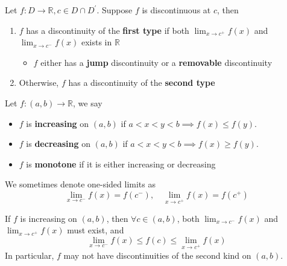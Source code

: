 
\begin{definition}
    Let $f: D \to \mathbb{R}, c \in D \cap D^{\prime}$.
    Suppose $f$ is discontinuous at $c$, then
    \begin{enumerate}
        \item $f$ has a discontinuity of the \textbf{first type} if 
        both
        $\lim_{x \to c^+}f(x)$ and $\lim_{x \to c^-}f(x)$ exists in $\mathbb{R}$
        \begin{itemize}
            \item $f$ either has a \textbf{jump} discontinuity or a \textbf{removable} discontinuity
        \end{itemize} 
        \item Otherwise, $f$ has a discontinuity of the \textbf{second type}
    \end{enumerate} 
\end{definition}

\begin{definition}
    Let $f: (a, b) \to \mathbb{R}$, we say 
    \begin{itemize}
        \item 
    $f$ is \textbf{increasing} 
    on $(a, b)$ 
    if $a < x  < y < b \implies f(x) \leq f(y)$.
        \item 
    $f$ is \textbf{decreasing} 
    on $(a, b)$ 
    if $a < x  < y < b \implies f(x) \geq f(y)$.
    \item $f$ is \textbf{monotone} if it is either increasing or decreasing
    \end{itemize} 
\end{definition}

\begin{remark}
    We sometimes denote one-sided limits as 
    \[
        \lim_{x \to c^-}f(x) = f(c^-),
        \quad
        \lim_{x \to c^+}f(x) = f(c^+)
    \]
\end{remark}


\begin{proposition}
    If $f$ is increasing on $(a, b)$, then 
    $\forall c \in (a, b)$, both $\lim_{x \to c^-}f(x)$  and 
    $\lim_{x \to c^+}f(x)$ must exist, and 
    \[
        \lim_{x \to c^-}f(x) \leq f(c) \leq \lim_{x \to c^+}f(x)
    \]
    In particular, $f$ may not have discontinuities of the second kind 
    on $(a,b)$.
\end{proposition}

